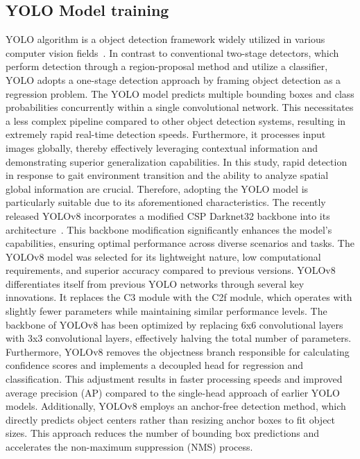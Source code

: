 \documentclass[journal,article,submit,pdftex,moreauthors]{Definitions/mdpi}
\begin{document}
\subsection{YOLO Model training}
YOLO algorithm is a object detection framework widely utilized in various computer vision fields~\cite{Redmon2016}. In contrast to conventional two-stage detectors, which perform detection through a region-proposal method and utilize a classifier, YOLO adopts a one-stage detection approach by framing object detection as a regression problem. The YOLO model predicts multiple bounding boxes and class probabilities concurrently within a single convolutional network. This necessitates a less complex pipeline compared to other object detection systems, resulting in extremely rapid real-time detection speeds. Furthermore, it processes input images globally, thereby effectively leveraging contextual information and demonstrating superior generalization capabilities. In this study, rapid detection in response to gait environment transition and the ability to analyze spatial global information are crucial. Therefore, adopting the YOLO model is particularly suitable due to its aforementioned characteristics.
The recently released YOLOv8 incorporates a modified CSP Darknet32 backbone into its architecture~\cite{Terven2023}. This backbone modification significantly enhances the model's capabilities, ensuring optimal performance across diverse scenarios and tasks. The YOLOv8 model was selected for its lightweight nature, low computational requirements, and superior accuracy compared to previous versions.
YOLOv8 differentiates itself from previous YOLO networks through several key innovations. It replaces the C3 module with the C2f module, which operates with slightly fewer parameters while maintaining similar performance levels. The backbone of YOLOv8 has been optimized by replacing 6x6 convolutional layers with 3x3 convolutional layers, effectively halving the total number of parameters. %
Furthermore, YOLOv8 removes the objectness branch responsible for calculating confidence scores and implements a decoupled head for regression and classification. This adjustment results in faster processing speeds and improved average precision (AP) compared to the single-head approach of earlier YOLO models. Additionally, YOLOv8 employs an anchor-free detection method, which directly predicts object centers rather than resizing anchor boxes to fit object sizes. This approach reduces the number of bounding box predictions and accelerates the non-maximum suppression (NMS) process.
\end{document}
